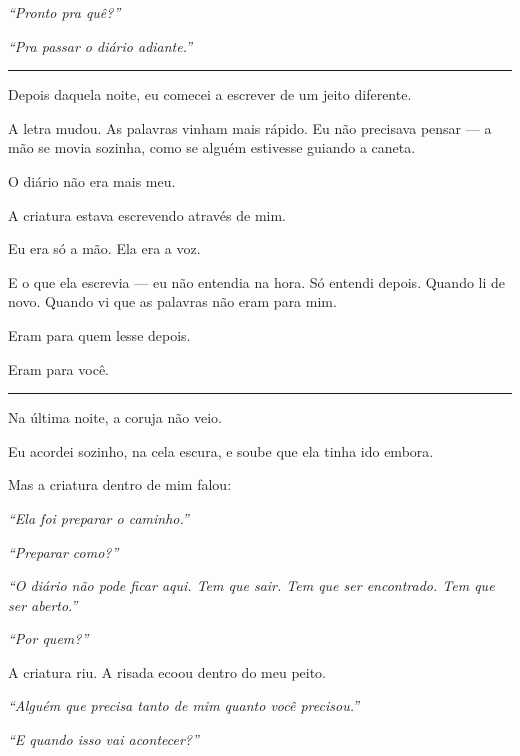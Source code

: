 \noindent \textit{\textquotedblleft{}Pronto pra quê?\textquotedblright{}}

\noindent \textit{\textquotedblleft{}Pra passar o diário adiante.\textquotedblright{}}

\vspace{0.5em}\noindent\rule{\textwidth}{0.5pt}\vspace{0.5em}

\noindent Depois daquela noite, eu comecei a escrever de um jeito diferente.

\noindent A letra mudou. As palavras vinham mais rápido. Eu não precisava pensar --- a mão se movia sozinha, como se alguém estivesse guiando a caneta.

\noindent O diário não era mais meu.

\noindent A criatura estava escrevendo através de mim.

\noindent Eu era só a mão.
Ela era a voz.

\noindent E o que ela escrevia --- eu não entendia na hora. Só entendi depois. Quando li de novo. Quando vi que as palavras não eram para mim.

\noindent Eram para quem lesse depois.

\noindent Eram para você.

\vspace{0.5em}\noindent\rule{\textwidth}{0.5pt}\vspace{0.5em}

\noindent Na última noite, a coruja não veio.

\noindent Eu acordei sozinho, na cela escura, e soube que ela tinha ido embora.

\noindent Mas a criatura dentro de mim falou:

\noindent \textit{\textquotedblleft{}Ela foi preparar o caminho.\textquotedblright{}}

\noindent \textit{\textquotedblleft{}Preparar como?\textquotedblright{}}

\noindent \textit{\textquotedblleft{}O diário não pode ficar aqui. Tem que sair. Tem que ser encontrado. Tem que ser aberto.\textquotedblright{}}

\noindent \textit{\textquotedblleft{}Por quem?\textquotedblright{}}

\noindent A criatura riu. A risada ecoou dentro do meu peito.

\noindent \textit{\textquotedblleft{}Alguém que precisa tanto de mim quanto você precisou.\textquotedblright{}}

\noindent \textit{\textquotedblleft{}E quando isso vai acontecer?\textquotedblright{}}

